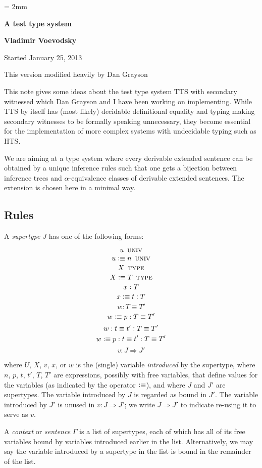 \documentclass[11pt]{article}
\newcommand{\eqd}{\equiv}
\newcommand{\ccolon}{\vcentcolon}
\newcommand{\Univ}{\mathop{\text{ \sc univ}}}
\newcommand{\Type}{\mathop{\text{ \sc type}}}
\newcommand{\defn}{\vcentcolon\equiv}
\begin{document}
\parskip = 2mm
\begin{center}
{\bf\Large A test type system}

{\bf Vladimir Voevodsky}

{Started January 25, 2013}  

{This version modified heavily by Dan Grayson}  
\end{center}

\tableofcontents

This note gives some ideas about the test type system TTS with secondary
witnessed which Dan Grayson and I have been working on implementing. While TTS
by itself has (most likely) decidable definitional equality and typing making
secondary witnesses to be formally speaking unnecessary, they become essential
for the implementation of more complex systems with undecidable typing such as
HTS.

We are aiming at a type system where every derivable extended sentence can be
obtained by a unique inference rules such that one gets a bijection between
inference trees and $\alpha$-equivalence classes of derivable extended
sentences.  The extension is chosen here in a minimal way.

\subsection{Rules}

A {\em supertype} $J$ has one of the following forms:

$$ u \Univ $$
$$ u \defn n \Univ $$
$$ X \Type $$
$$ X \defn T \Type $$
$$ x \ccolon T $$
$$ x \defn t \ccolon T $$
$$ w : T \eqd T' $$
$$ w \defn p : T \eqd T' $$
$$ w : t \eqd t' \ccolon T \eqd T' $$
$$ w \defn p : t \eqd t' \ccolon T \eqd T' $$
$$ v : J \Rightarrow J' $$

where $U$, $X$, $v$, $x$, or $w$ is the (single) variable {\em introduced} by
the supertype, where $n$, $p$, $t$, $t'$, $T$, $T'$ are expressions, possibly
with free variables, that define values for the variables (as indicated by the
operator $\defn$), and where $J$ and $J'$ are supertypes.  The variable
introduced by $J$ is regarded as bound in $J'$.  The variable introduced by
$J'$ is unused in $ v : J \Rightarrow J' $; we write $ J \Rightarrow J' $ to
indicate re-using it to serve as $v$.

A {\em context} or {\em sentence} $\Gamma$ is a list of supertypes, each of
which has all of its free variables bound by variables introduced earlier in
the list.  Alternatively, we may say the variable introduced by a supertype in
the list is bound in the remainder of the list.
\end{document}
